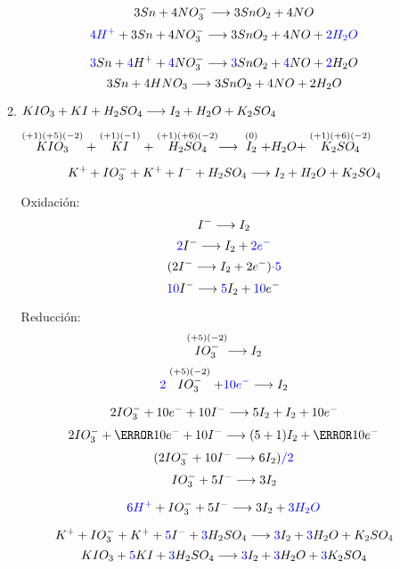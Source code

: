\documentclass[../Práctica.root.tex]{subfiles}
\begin{document}
\begin{enumerate}
\begin{enumerate}
                    \[ 3 Sn + 4 NO_3^- \longrightarrow{} 3 SnO_2 + 4 NO \]
                    \[ \textcolor{blue}{4H^+} + 3 Sn + 4 NO_3^- \longrightarrow{} 3 SnO_2 + 4 NO + \textcolor{blue}{2H_2O} \]

                    \[ \textcolor{blue}{3} Sn + \textcolor{blue}{4} H^+ + \textcolor{blue}{4} NO_3^- \longrightarrow{} \textcolor{blue}{3} SnO_2 + \textcolor{blue}{4} NO + \textcolor{blue}{2} H_2O \]
                    \[ 3 Sn + 4 HNO_3 \longrightarrow{} 3 SnO_2 + 4 NO + 2 H_2O \]

              \item $KIO_3 + KI + H_2SO_4 \longrightarrow{} I_2 + H_2O + K_2SO_4$

                    $\stackrel{(+1)(+5)(-2)}{KIO_3} + \stackrel{(+1)(-1)}{KI} + \stackrel{(+1)(+6)(-2)}{H_2SO_4}
                        \longrightarrow{} \stackrel{(0)}{I_2} + H_2O + \stackrel{(+1)(+6)(-2)}{K_2SO_4}$

                    \[ K^+ + IO_3^- + K^+ + I^- + H_2SO_4 \longrightarrow{} I_2 + H_2O + K_2SO_4 \]
                    \begin{multicols}{2}
                        Oxidación:
                        \[ I^- \longrightarrow{} I_2 \]
                        \[ \textcolor{blue}{2} I^- \longrightarrow{} I_2 + \textcolor{blue}{2e^-} \]
                        \[ (2 I^- \longrightarrow{} I_2 + 2e^-)\textcolor{blue}{\cdot 5} \]
                        \[ \textcolor{blue}{10} I^- \longrightarrow{} \textcolor{blue}{5} I_2 + \textcolor{blue}{10} e^- \]

                        \columnbreak

                        Reducción:
                        \[ \stackrel{(+5)(-2)}{IO_3^-} \longrightarrow{} I_2 \]
                        \[ \textcolor{blue}{2} \stackrel{(+5)(-2)}{IO_3^-} + \textcolor{blue}{10e^-} \longrightarrow{} I_2 \]
                    \end{multicols}

                    \[ 2 IO_3^- + 10 e^- + 10 I^- \longrightarrow{} 5 I_2 + I_2 + 10 e^- \]
                    \[ 2 IO_3^- + \cancel{10 e^-} + 10 I^- \lra (5 + 1) I_2 + \cancel{10 e^-} \]
                    \[ (2 IO_3^- + 10 I^- \longrightarrow{} 6 I_2)\textcolor{blue}{/2} \]
                    \[ IO_3^- + 5 I^- \longrightarrow{} 3 I_2 \]

                    \[ \textcolor{blue}{6H^+} + IO_3^- + 5 I^- \longrightarrow{} 3 I_2 + \textcolor{blue}{3H_2O} \]

                    \[ K^+ + IO_3^- + K^+ + \textcolor{blue}{5} I^- + \textcolor{blue}{3} H_2SO_4 \longrightarrow{} \textcolor{blue}{3} I_2 + \textcolor{blue}{3} H_2O + K_2SO_4 \]
                    \[ KIO_3 + \textcolor{blue}{5} KI + \textcolor{blue}{3} H_2SO_4 \longrightarrow{} \textcolor{blue}{3} I_2 + \textcolor{blue}{3} H_2O + \textcolor{blue}{3} K_2SO_4 \]


\end{enumerate}
\end{enumerate}
\end{document}
